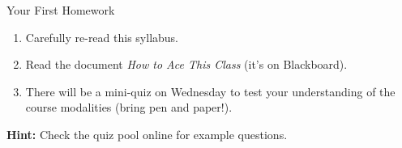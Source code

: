 \documentclass[professionalfonts, xcolor={usenames,svgnames,x11names,table}]{beamer}
\begin{document}
\begin{frame}{Your First Homework}
    \begin{enumerate}
        \item Carefully re-read this syllabus.
        \item Read the document \emph{How to Ace This Class} (it's on Blackboard).
        \item There will be a mini-quiz on Wednesday to test your understanding of the course modalities (bring pen and paper!).
    \end{enumerate}

    \textbf{Hint:} Check the quiz pool online for example questions.
\end{frame}



\end{document}
